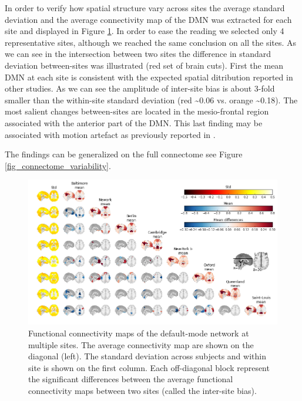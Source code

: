 \documentclass[authoryear]{elsarticle}
\begin{document}
In order to verify how spatial structure vary across sites the average standard deviation and the average connectivity map of the DMN was extracted for each site and displayed in Figure \ref{fig_DMN_variability}. In order to ease the reading we selected only 4 representative sites, although we reached the same conclusion on all the sites. As we can see in the intersection between two sites the difference in standard deviation between-sites was illustrated (red set of brain cuts). First the mean DMN at each site is consistent with the expected spatial ditribution reported in other studies. As we can see the amplitude of inter-site bias is about 3-fold smaller than the within-site standard deviation (red \textasciitilde0.06 vs. orange \textasciitilde0.18). The most salient changes between-sites are located in the mesio-frontal region associated with the anterior part of the DMN. This last finding may be associated with motion artefact as previously reported in \cite{Dansereau2014}.


The findings can be generalized on the full connectome see Figure \ref{fig_connectome_variability}.



\begin{figure}[H!]
\begin{center}
\includegraphics[width=\linewidth]{../figures/pccmap_multisite.png}
\end{center}
\caption[DMN variability across sites]{
Functional connectivity maps of the default-mode network at multiple sites. The average connectivity map are shown on the diagonal (left). The standard deviation across subjects and within site is shown on the first column. Each off-diagonal block represent the significant differences between the average functional connectivity maps between two sites (called the inter-site bias).
}
\label{fig_DMN_variability}
\end{figure}
\end{document}
